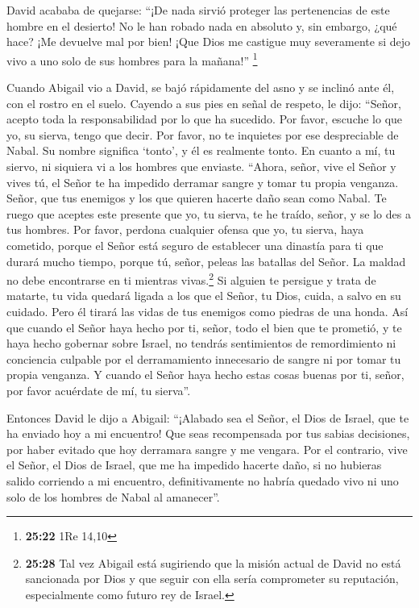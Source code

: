  David acababa de quejarse: ``¡De nada sirvió proteger
las pertenencias de este hombre en el desierto! No le han robado nada en
absoluto y, sin embargo, ¿qué hace? ¡Me devuelve mal por bien!
 ¡Que Dios me castigue muy severamente si dejo vivo a uno
solo de sus hombres para la mañana!'' \footnote{\textbf{25:22} 1Re 14,10}

 Cuando Abigail vio a David, se bajó rápidamente del asno
y se inclinó ante él, con el rostro en el suelo.  Cayendo
a sus pies en señal de respeto, le dijo: ``Señor, acepto toda la
responsabilidad por lo que ha sucedido. Por favor, escuche lo que yo, su
sierva, tengo que decir.  Por favor, no te inquietes por
ese despreciable de Nabal. Su nombre significa `tonto', y él es
realmente tonto. En cuanto a mí, tu siervo, ni siquiera vi a los hombres
que enviaste.  ``Ahora, señor, vive el Señor y vives tú,
el Señor te ha impedido derramar sangre y tomar tu propia venganza.
Señor, que tus enemigos y los que quieren hacerte daño sean como Nabal.
 Te ruego que aceptes este presente que yo, tu sierva, te
he traído, señor, y se lo des a tus hombres.  Por favor,
perdona cualquier ofensa que yo, tu sierva, haya cometido, porque el
Señor está seguro de establecer una dinastía para ti que durará mucho
tiempo, porque tú, señor, peleas las batallas del Señor. La maldad no
debe encontrarse en ti mientras vivas.\footnote{\textbf{25:28} Tal vez
  Abigail está sugiriendo que la misión actual de David no está
  sancionada por Dios y que seguir con ella sería comprometer su
  reputación, especialmente como futuro rey de Israel.} 
Si alguien te persigue y trata de matarte, tu vida quedará ligada a los
que el Señor, tu Dios, cuida, a salvo en su cuidado. Pero él tirará las
vidas de tus enemigos como piedras de una honda.  Así que
cuando el Señor haya hecho por ti, señor, todo el bien que te prometió,
y te haya hecho gobernar sobre Israel,  no tendrás
sentimientos de remordimiento ni conciencia culpable por el
derramamiento innecesario de sangre ni por tomar tu propia venganza. Y
cuando el Señor haya hecho estas cosas buenas por ti, señor, por favor
acuérdate de mí, tu sierva''.

 Entonces David le dijo a Abigail: ``¡Alabado sea el
Señor, el Dios de Israel, que te ha enviado hoy a mi encuentro!
 Que seas recompensada por tus sabias decisiones, por
haber evitado que hoy derramara sangre y me vengara.  Por
el contrario, vive el Señor, el Dios de Israel, que me ha impedido
hacerte daño, si no hubieras salido corriendo a mi encuentro,
definitivamente no habría quedado vivo ni uno solo de los hombres de
Nabal al amanecer''.

